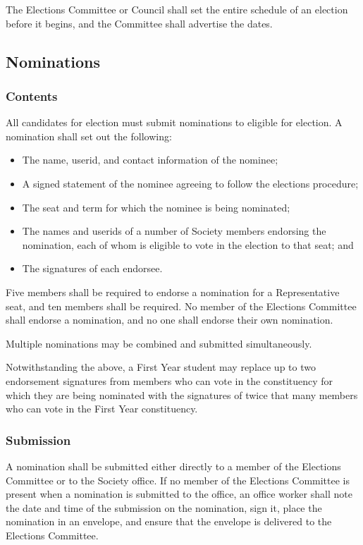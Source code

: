 The Elections Committee or Council shall set the entire schedule of an election
before it begins, and the Committee shall advertise the dates.

\subsection{Nominations}
\subsubsection{Contents}
All candidates for election must submit nominations to eligible for election.
A nomination shall set out the following:
\begin{itemize}
\item The name, userid, and contact information of the nominee;
\item A signed statement of the nominee agreeing to follow the elections
procedure;
\item The seat and term for which the nominee is being nominated;
\item The names and userids of a number of Society members endorsing the
nomination, each of whom is eligible to vote in the election to that seat; and
\item The signatures of each endorsee.
\end{itemize}
Five members shall be required to endorse a nomination for a Representative
seat, and ten members shall be required. No member of the Elections Committee
shall endorse a nomination, and no one shall endorse their own nomination.

Multiple nominations may be combined and submitted simultaneously.

Notwithstanding the above, a First Year student may replace up to two
endorsement signatures from members who can vote in the constituency for which
they are being nominated with the signatures of twice that many members who can
vote in the First Year constituency.
\subsubsection{Submission}
A nomination shall be submitted either directly to a member of the Elections
Committee or to the Society office. If no member of the Elections Committee is
present when a nomination is submitted to the office, an office worker shall
note the date and time of the submission on the nomination, sign it, place the
nomination in an envelope, and ensure that the envelope is delivered to the
Elections Committee.

